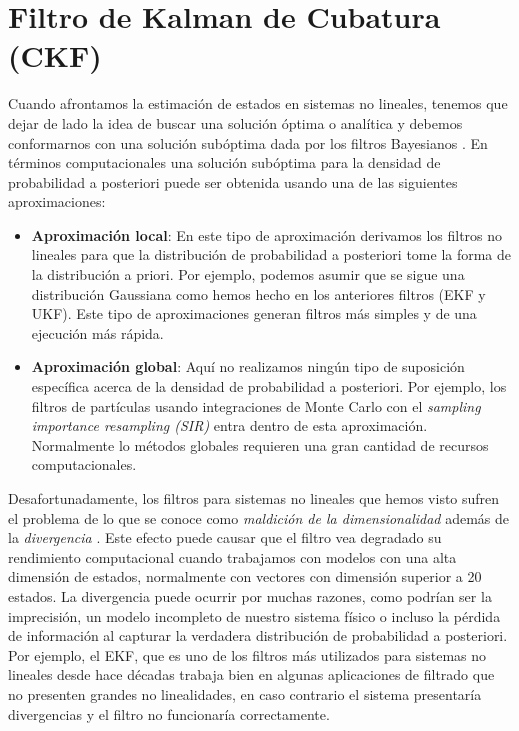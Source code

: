 \section{Filtro de Kalman de Cubatura (CKF)}
Cuando afrontamos la estimación de estados en sistemas no lineales, tenemos que dejar de lado la idea de buscar una solución óptima o analítica y debemos conformarnos con una solución subóptima dada por los filtros Bayesianos \cite{_cubature-based_2010} \cite{ienkaran_cubature_2009} \cite{zhang_cubature_2013}.
En términos computacionales una solución subóptima para la densidad de probabilidad a posteriori puede ser obtenida usando una de las siguientes aproximaciones:
\begin{itemize}
\item \textbf{Aproximación local}: En este tipo de aproximación derivamos los filtros no lineales para que la distribución de probabilidad a posteriori tome la forma de la distribución a priori.
Por ejemplo, podemos asumir que se sigue una distribución Gaussiana como hemos hecho en los anteriores filtros (\ac{EKF} y \ac{UKF}).
Este tipo de aproximaciones generan filtros más simples y de una ejecución más rápida.
\item \textbf{Aproximación global}: Aquí no realizamos ningún tipo de suposición específica acerca de la densidad de probabilidad a posteriori. 
Por ejemplo, los filtros de partículas usando integraciones de Monte Carlo con el \textit{sampling importance resampling (SIR)} entra dentro de esta aproximación.
%
%
%
Normalmente lo métodos globales requieren una gran cantidad de recursos computacionales.
\end{itemize}
Desafortunadamente, los filtros para sistemas no lineales que hemos visto sufren el problema de lo que se conoce como \textit{maldición de la dimensionalidad} además de la \textit{divergencia} \cite{ienkaran_cubature_2009}.
Este efecto puede causar que el filtro vea degradado su rendimiento computacional cuando trabajamos con modelos con una alta dimensión de estados, normalmente con vectores con dimensión superior a 20 estados.
%
%
%
La divergencia puede ocurrir por muchas razones, como podrían ser la imprecisión, un modelo incompleto de nuestro sistema físico o incluso la pérdida de información al capturar la verdadera distribución de probabilidad a posteriori.
Por ejemplo, el \ac{EKF}, que es uno de los filtros más utilizados para sistemas no lineales desde hace décadas trabaja bien en algunas aplicaciones de filtrado que no presenten grandes no linealidades, en caso contrario el sistema presentaría divergencias y el filtro no funcionaría correctamente.

